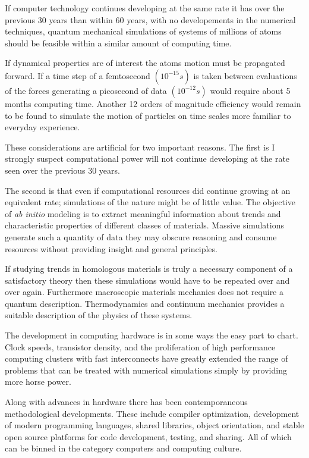 If computer technology continues developing at the same rate it has
over the previous 30 years than within 60 years, with no developements in the numerical techniques, 
quantum mechanical simulations of systems of millions of atoms should be feasible
within a similar amount of computing time. 

If dynamical properties are of interest the atoms motion must be propagated forward. 
If a time step of a femtosecond $(10^{-15}s)$ is taken between evaluations of the 
forces generating a picosecond of data $(10^{-12}s)$ would require about 5 months 
computing time. Another 12 orders of magnitude efficiency would remain to be found to 
simulate the motion of particles on time scales more familiar to everyday experience.

These considerations are artificial for two important reasons. The first
is I strongly suspect computational power will not continue developing at the rate
seen over the previous 30 years. 

The second is that even if computational resources did continue growing 
at an equivalent rate; simulations of the nature might be of little value.
The objective of {\it ab initio} modeling is to extract meaningful information
about trends and characteristic properties of different classes of materials. 
Massive simulations generate such a quantity of data they may obscure 
reasoning and consume resources without providing insight and general principles.

If studying trends in homologous materials is truly a necessary component of a satisfactory
theory then these simulations would have to be repeated over and over again.
Furthermore macroscopic materials mechanics does not require a quantum description.
Thermodynamics and continuum mechanics provides a suitable description of the physics of these systems. 

The development in computing hardware is in some ways the easy part to chart. 
Clock speeds, transistor density, and the proliferation of high 
performance computing clusters with fast interconnects have greatly extended 
the range of problems that can be treated with numerical simulations
simply by providing more horse power.

Along with advances in hardware there has been contemporaneous methodological developments.
These include compiler optimization, development of modern programming languages, 
shared libraries, object orientation, and stable open source platforms for 
code development, testing, and sharing. All of which can be binned in the 
category computers and computing culture.

